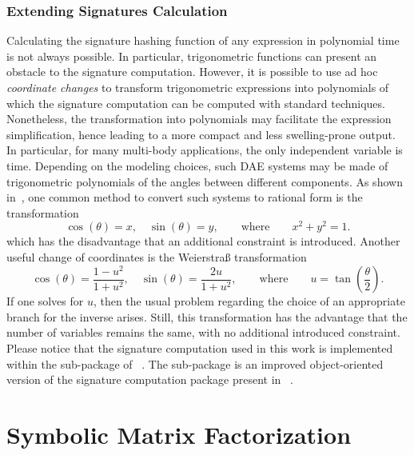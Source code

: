 \subsubsection{Extending Signatures Calculation}
\label{chap2:sec:signature}

Calculating the signature hashing function of any expression in polynomial time is not always possible. In particular, trigonometric functions can present an obstacle to the signature computation. However, it is possible to use ad hoc \emph{coordinate changes} to transform trigonometric expressions into polynomials of which the signature computation can be computed with standard techniques. Nonetheless, the transformation into polynomials may facilitate the expression simplification, hence leading to a more compact and less swelling-prone output. In particular, for many multi-body applications, the only independent variable is time. Depending on the modeling choices, such \ac{DAE} systems may be made of trigonometric polynomials of the angles between different components. As shown in~\cite{zhou2005implicit}, one common method to convert such systems to rational form is the transformation
%
\begin{equation}
  \label{chap2:eq:zhou}
  \cos(\theta) = x, \quad
  \sin(\theta) = y,
  \qquad \text{where} \qquad
  x^2 + y^2 = 1.
\end{equation}
%
which has the disadvantage that an additional constraint is introduced. Another useful change of coordinates is the Weierstra{\ss} transformation~\cite{cox1994ideals}
%
\begin{equation}
  \label{chap2:eq:weierstrass}
  \cos(\theta) = \dfrac{1 - u^2}{1 + u^2}, \quad
  \sin(\theta) = \dfrac{2u}{1 + u^2},
  \qquad \text{where} \qquad
  u = \tan\left(\dfrac{\theta}{2}\right).
\end{equation}
%
If one solves for $u$, then the usual problem regarding the choice of an appropriate branch for the inverse arises. Still, this transformation has the advantage that the number of variables remains the same, with no additional introduced constraint. Please notice that the signature computation used in this work is implemented within the \SIG{} sub-package of \LEM{}~\cite{lem}. The \SIG{} sub-package is an improved object-oriented version of the signature computation package present in \LULEM{}~\cite{carette2006linear}.


\section{Symbolic Matrix Factorization}
\label{chap2:sec:last}

